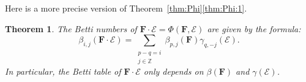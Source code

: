 \documentclass[12pt]{amsart}
\newtheorem{theorem}[lemma]{Theorem}
\theoremstyle{definition}
\theoremstyle{remark}
\newcommand{\ZZ}{\mathbb{Z}}
\newcommand{\cE}{\mathcal{E}}
\newcommand{\FF}{\mathbf{F}}
\begin{document}
 Here is a more precise version of Theorem~\ref{thm:Phi}\eqref{thm:Phi:1}.
\begin{theorem}\label{thm:betti numbers of pairing}
The Betti numbers of $\FF\cdot \cE = \Phi(\FF,\cE)$ are given by the formula:
\[
\beta_{i,j}(\FF\cdot \cE)=\sum_{\substack{p-q=i\\ j\in \ZZ}}  \beta_{p,j}(\FF)\gamma_{q,-j}(\cE).
\]
In particular, the Betti table of $\FF\cdot \cE$ only depends on $\beta(\FF)$ and $\gamma(\cE)$.
\end{theorem}
\end{document}
